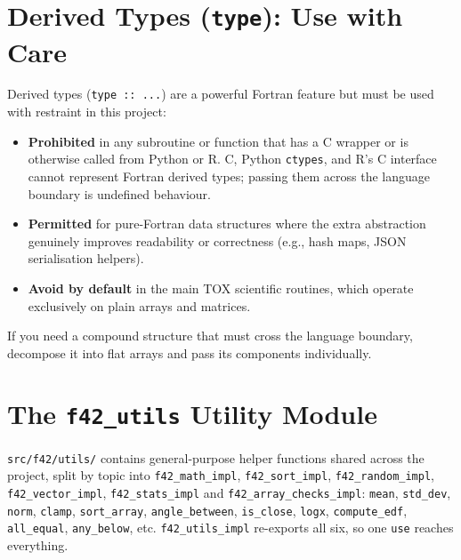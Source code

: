 \documentclass{article}
\begin{document}
\section{Derived Types (\texttt{type}): Use with Care}

Derived types (\texttt{type :: ...}) are a powerful Fortran feature but must be used with restraint in this project:

\begin{itemize}
  \item \textbf{Prohibited} in any subroutine or function that has a C wrapper or is otherwise called from Python or R.
    C, Python \texttt{ctypes}, and R's C interface cannot represent Fortran derived types; passing them across the language boundary is undefined behaviour.
  \item \textbf{Permitted} for pure-Fortran data structures where the extra abstraction genuinely improves readability or correctness (e.g., hash maps, JSON serialisation helpers).
  \item \textbf{Avoid by default} in the main TOX scientific routines, which operate exclusively on plain arrays and matrices.
\end{itemize}

If you need a compound structure that must cross the language boundary, decompose it into flat arrays and pass its components individually.

\section{The \texttt{f42\_utils} Utility Module}

\begin{sloppypar}
\texttt{src/f42/utils/} contains general-purpose helper functions shared across the project, split
by topic into \texttt{f42\_math\_impl}, \texttt{f42\_sort\_impl}, \texttt{f42\_random\_impl},
\texttt{f42\_vector\_impl}, \texttt{f42\_stats\_impl} and \texttt{f42\_array\_checks\_impl}:
\texttt{mean}, \texttt{std\_dev}, \texttt{norm}, \texttt{clamp}, \texttt{sort\_array},
\texttt{angle\_between}, \texttt{is\_close}, \texttt{logx}, \texttt{compute\_edf}, \texttt{all\_equal},
\texttt{any\_below}, etc. \texttt{f42\_utils\_impl} re-exports all six, so one \texttt{use} reaches
everything.
\end{sloppypar}
\end{document}
